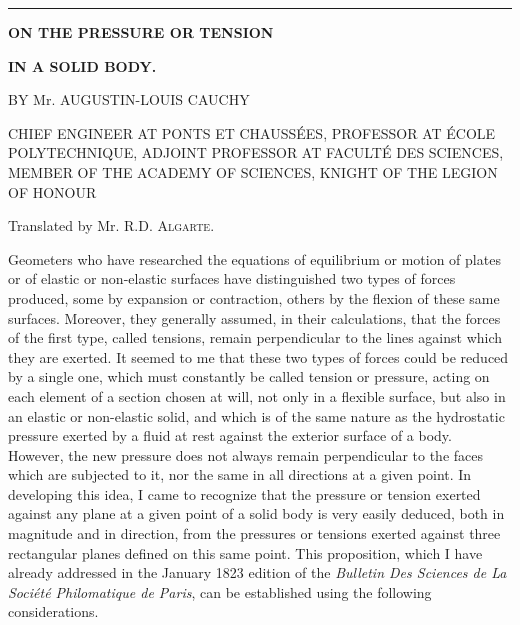 \documentclass[leqno,openright,smallroyalvopaper,8pt,twoside,showtrims]{memoir}
\begin{document}
\vspace*{0.5cm}
\noindent
\rule{\textwidth}{0.5pt}\vspace*{-\baselineskip}\vspace*{2pt} 
\vspace*{.2cm}
\begin{center}
{\LARGE \textbf{ON THE PRESSURE OR TENSION}}\vspace*{3pt} 

{\Large \textbf{IN A SOLID BODY.}}\vspace*{10pt} 

{\large BY Mr. AUGUSTIN-LOUIS CAUCHY} \vspace*{2pt} 

{CHIEF ENGINEER AT PONTS ET CHAUSS\'EES, PROFESSOR AT \'ECOLE POLYTECHNIQUE, ADJOINT PROFESSOR AT FACULT\'E DES SCIENCES, MEMBER OF THE ACADEMY OF SCIENCES, KNIGHT OF THE LEGION OF HONOUR}\vspace*{2pt} 


{\small Translated by Mr. R.D. {\normalfont\scshape Algarte}}.\vspace*{.5cm}

\quad{}\quad{}\vspace*{.5cm}


\end{center}
\normalfont

Geometers who have researched the equations of equilibrium or motion of plates or of elastic or non-elastic surfaces have distinguished two types of forces produced, some by expansion or contraction, others by the flexion of these same surfaces. Moreover, they generally assumed, in their calculations, that the forces of the first type, called tensions, remain perpendicular to the lines against which they are exerted. It seemed to me that these two types of forces could be reduced by a single one, which must constantly be called tension or pressure, acting on each element of a section chosen at will, not only in a flexible surface, but also in an elastic or non-elastic solid, and which is of the same nature as the hydrostatic pressure exerted by a fluid at rest against the exterior surface of a body. However, the new pressure does not always remain perpendicular to the faces which are subjected to it, nor the same in all directions at a given point. In developing this idea, I came to recognize that the pressure or tension exerted against any plane at a given point of a solid body is very easily deduced, both in magnitude and in direction, from the pressures or tensions exerted against three rectangular planes defined on this same point. This proposition, which I have already addressed in the January 1823 edition of the \emph{Bulletin Des Sciences de La Soci\'et\'e Philomatique de Paris}, can be established using the following considerations.
\end{document}
